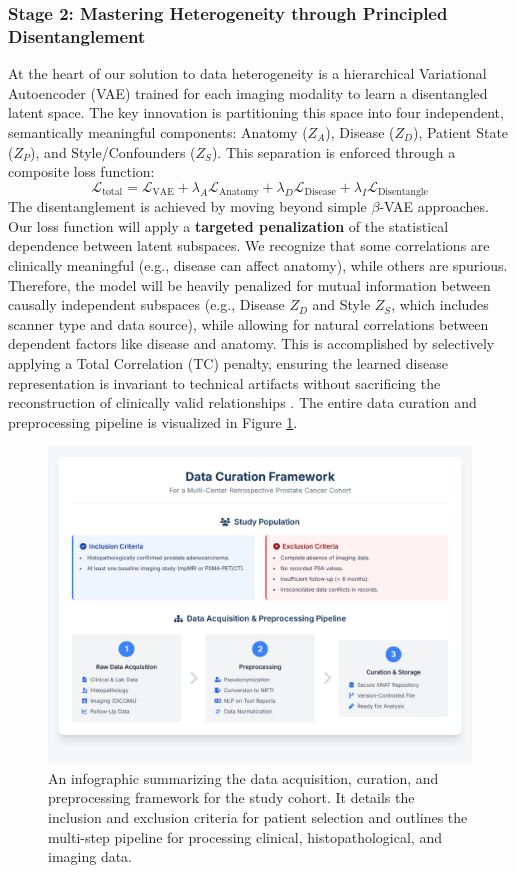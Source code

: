 \documentclass[11pt, a4paper]{article}
\begin{document}
\subsubsection{Stage 2: Mastering Heterogeneity through Principled Disentanglement}
At the heart of our solution to data heterogeneity is a hierarchical Variational Autoencoder (VAE) trained for each imaging modality to learn a disentangled latent space. The key innovation is partitioning this space into four independent, semantically meaningful components: Anatomy ($Z_A$), Disease ($Z_D$), Patient State ($Z_P$), and Style/Confounders ($Z_S$). This separation is enforced through a composite loss function:
$$ \mathcal{L}_{\text{total}} = \mathcal{L}_{\text{VAE}} + \lambda_A \mathcal{L}_{\text{Anatomy}} + \lambda_D \mathcal{L}_{\text{Disease}} + \lambda_I \mathcal{L}_{\text{Disentangle}} $$
The disentanglement is achieved by moving beyond simple $\beta$-VAE approaches. Our loss function will apply a \textbf{targeted penalization} of the statistical dependence between latent subspaces. We recognize that some correlations are clinically meaningful (e.g., disease can affect anatomy), while others are spurious. Therefore, the model will be heavily penalized for mutual information between causally independent subspaces (e.g., Disease $Z_D$ and Style $Z_S$, which includes scanner type and data source), while allowing for natural correlations between dependent factors like disease and anatomy. This is accomplished by selectively applying a Total Correlation (TC) penalty, ensuring the learned disease representation is invariant to technical artifacts without sacrificing the reconstruction of clinically valid relationships \cite{FragemannArdizzone2022, AbbasiMonadjemi2018, FayCobos2023}. The entire data curation and preprocessing pipeline is visualized in Figure \ref{fig:data_curation}.

\begin{figure}[H]
    \centering
    \includegraphics[width=\textwidth]{dc.png}
    \caption{An infographic summarizing the data acquisition, curation, and preprocessing framework for the study cohort. It details the inclusion and exclusion criteria for patient selection and outlines the multi-step pipeline for processing clinical, histopathological, and imaging data.}
    \label{fig:data_curation}
\end{figure}
\end{document}
